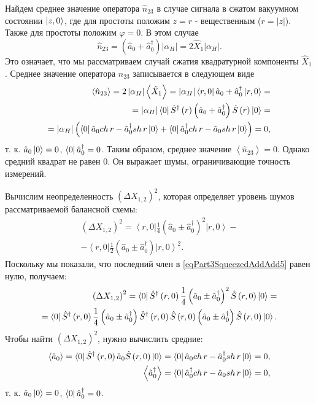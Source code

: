 Найдем среднее значение оператора $\hat{n}_{23}$ в случае сигнала в
сжатом вакуумном состоянии $\ket{z, 0}$, где для простоты
положим $z = r$ - вещественным ($r = \left|z\right|$). Также для
простоты положим $\varphi = 0$. В этом случае 
\[
\hat{n}_{23} =
\left(\hat{a}_0 + \hat{a}_0^{\dag}\right) \left|\alpha_H\right| = 
2 \hat{X}_1 \left|\alpha_H\right|.
\]
Это означает, что мы рассматриваем случай сжатия квадратурной
компоненты $\hat{X}_1$. Среднее значение оператора $\hat{n}_{23}$
записывается в следующем виде
\begin{eqnarray}
\left<\hat{n}_{23}\right> = 
2 \left|\alpha_H\right|\left<\hat{X}_1\right> = 
\left|\alpha_H\right|\bra{r, 0}\hat{a}_0 +
\hat{a}_0^{\dag}\ket{r, 0} =
\nonumber \\
=
\left|\alpha_H\right|\bra{0}
\hat{S}^{\dag}\left(r\right)
\left(\hat{a}_0 +
\hat{a}_0^{\dag}\right)
\hat{S}\left(r\right)
\ket{0} =
\nonumber \\
=
\left|\alpha_H\right|
\left(
\bra{0}
\hat{a}_0 ch\,r -
\hat{a}_0^{\dag} sh\,r
\ket{0} 
+
\bra{0}
\hat{a}_0^{\dag} ch\,r -
\hat{a}_0 sh\,r
\ket{0} 
\right)
= 0,
\nonumber
\end{eqnarray}
т. к. $\hat{a}_0\ket{0} = 0$, 
$\bra{0}\hat{a}_0^{\dag} = 0$.
Таким образом, среднее значение $\left<\hat{n}_{23}\right> =
0$. Однако средний квадрат не равен 0. Он выражает шумы, ограничивающие
точность измерений.

Вычислим неопределенность $\left(\Delta X_{1,2}\right)^2$, которая
определяет уровень шумов рассматриваемой балансной схемы:
\begin{eqnarray}
\left(\Delta X_{1,2}\right)^2 = 
\left<r,
0\right|\frac{1}{4}\left(\hat{a}_0\pm\hat{a}_0^{\dag}\right)^2\left|r,
0\right> -
\nonumber \\
-
\left<r,
0\right|\frac{1}{2}\left(\hat{a}_0\pm\hat{a}_0^{\dag}\right)\left|r,
0\right>^2.
\label{eqPart3SqueezedAddAdd5}
\end{eqnarray}
Поскольку мы показали, что последний член в
\eqref{eqPart3SqueezedAddAdd5} равен нулю, получаем:
\begin{eqnarray}
\left(\Delta X_{1,2}\right)^2 = 
\bra{0}\hat{S}^{\dag}\left(r, 0\right)
\frac{1}{4}\left(\hat{a}_0\pm\hat{a}_0^{\dag}\right)^2
\hat{S}\left(r, 0\right)
\ket{0} = 
\nonumber \\
=
\bra{0}\hat{S}^{\dag}\left(r, 0\right)
\frac{1}{4}
\left(\hat{a}_0\pm\hat{a}_0^{\dag}\right)
\hat{S}^{\dag}\left(r, 0\right)
\hat{S}\left(r, 0\right)
\left(\hat{a}_0\pm\hat{a}_0^{\dag}\right)
\hat{S}\left(r, 0\right)
\ket{0}.
\label{eqPart3SqueezedAddAdd6}
\end{eqnarray}
Чтобы найти 
$\left(\Delta X_{1,2}\right)^2$, нужно вычислить средние:
\begin{eqnarray}
\left<\hat{a}_0\right> = 
\bra{0}
\hat{S}^{\dag}\left(r, 0\right)
\hat{a}_0
\hat{S}\left(r, 0\right)
\ket{0} = 
\bra{0}
\hat{a}_0 ch\,r - \hat{a}_0^{\dag} sh\,r
\ket{0} = 0,
\nonumber \\
\left<\hat{a}_0^{\dag}\right> = 
\bra{0}
\hat{a}_0^{\dag} ch\,r - \hat{a}_0 sh\,r
\ket{0} = 0,
\label{eqPart3SqueezedAddAdd7}
\end{eqnarray}
т. к. $\hat{a}_0\ket{0} = 0$, 
$\bra{0}\hat{a}_0^{\dag} = 0$.

